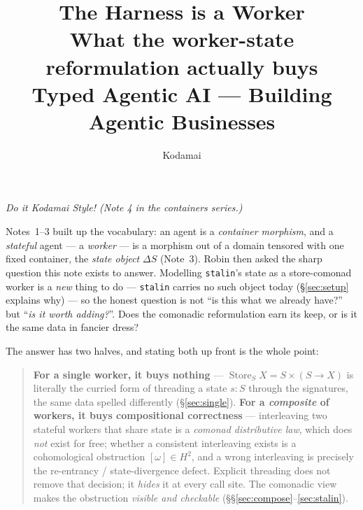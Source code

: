 \documentclass[11pt]{article}
\title{\textbf{The Harness is a Worker}\\[3pt]
  \large What the worker-state reformulation actually buys\\[2pt]
  \normalsize Typed Agentic AI --- Building Agentic Businesses}
\author{Kodamai}
\date{}
\DeclareMathOperator{\Store}{Store}
\theoremstyle{plain}
\theoremstyle{definition}
\begin{document}
\maketitle
\vspace{-2.5em}
\begin{center}\itshape Do it Kodamai Style! \quad(Note 4 in the containers series.)\end{center}
\vspace{0.5em}

\begin{center}\small
{}
\end{center}
\vspace{1em}

Notes~1--3 built up the vocabulary: an agent is a \emph{container morphism}, and a \emph{stateful}
agent --- a \emph{worker} --- is a morphism out of a domain tensored with one fixed container, the
\emph{state object} $\Delta S$ (Note~3). Robin then asked the sharp question this note exists to
answer. Modelling \texttt{stalin}'s state as a store-comonad worker is a \emph{new} thing to do ---
\texttt{stalin} carries no such object today (\S\ref{sec:setup} explains why) --- so the honest
question is not ``is this what we already have?'' but ``\emph{is it worth adding?}''. Does the
comonadic reformulation earn its keep, or is it the same data in fancier dress?

The answer has two halves, and stating both up front is the whole point:

\begin{quote}
\textbf{For a single worker, it buys nothing} --- $\Store_S X = S\times(S\to X)$ is literally the
curried form of threading a state $s:S$ through the signatures, the same data spelled differently
(\S\ref{sec:single}). \textbf{For a \emph{composite} of workers, it buys compositional correctness}
--- interleaving two stateful workers that share state is a \emph{comonad distributive law}, which
does \emph{not} exist for free; whether a consistent interleaving exists is a cohomological
obstruction $[\omega]\in H^2$, and a wrong interleaving is precisely the re-entrancy /
state-divergence defect. Explicit threading does not remove that decision; it \emph{hides} it at
every call site. The comonadic view makes the obstruction \emph{visible and checkable}
(\S\S\ref{sec:compose}--\ref{sec:stalin}).
\end{quote}
\end{document}
